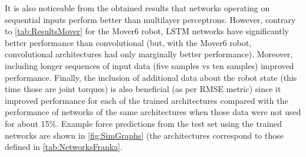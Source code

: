 It is also noticeable from the obtained results that networks operating on sequential inputs perform better than multilayer perceptrons. However, contrary to \cref{tab:ResultsMover} for the Mover6 robot, LSTM networks have significantly better performance than convolutional (but, with the Mover6 robot, convolutional architectures had only marginally better performance). Moreover, including longer sequences of input data (five samples vs ten samples) improved performance. Finally, the inclusion of additional data about the robot state (this time those are joint torques) is also beneficial (as per RMSE metric) since it improved performance for each of the trained architectures compared with the performance of networks of the same architectures when those data were not used for about 15\%. Example force predictions from the test set using the trained networks are shown in \cref{fig:SimGraphs} (the architectures correspond to those defined in \cref{tab:NetworksFranka}.

